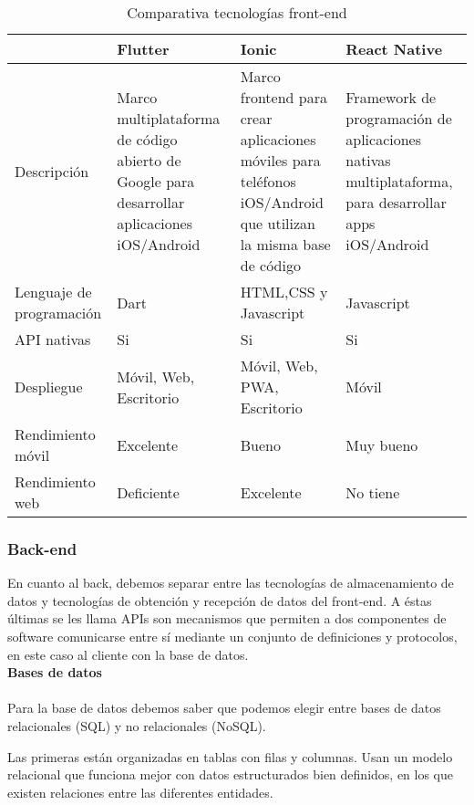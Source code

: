 \begin{table}[H] %
    \centering
    \begin{tabular}{|p{2cm} |p{4 cm} |p{4cm} |p{4cm} |} \hline 
         &  \textbf{Flutter}&  \textbf{Ionic}& \textbf{React Native}\\  \hline 
         Descripción &  Marco multiplataforma de código abierto de Google para desarrollar aplicaciones iOS/Android &  Marco frontend para crear aplicaciones móviles para teléfonos iOS/Android que utilizan la misma base de código& Framework de programación de aplicaciones nativas multiplataforma, para desarrollar apps iOS/Android\\ \hline 
         
        Lenguaje de programación &  Dart&  HTML,CSS y Javascript & Javascript\\ \hline 
        API nativas &  Si&  Si & Si\\ \hline 
        Despliegue &  Móvil, Web, Escritorio&  Móvil, Web, PWA, Escritorio & Móvil\\ \hline 
        Rendimiento móvil &  Excelente &  Bueno & Muy bueno\\ \hline 
        Rendimiento web &  Deficiente &  Excelente & No tiene\\ \hline 
    \end{tabular}
    \caption{Comparativa tecnologías front-end \cite{flut-ion} \cite{flut-react}}
    \label{tab:tec_front}
\end{table}

\subsubsection{Back-end}

En cuanto al back, debemos separar entre las tecnologías de almacenamiento de datos y tecnologías de obtención y recepción de datos del front-end. A éstas últimas se les llama APIs \cite{api} son mecanismos que permiten a dos componentes de software comunicarse entre sí mediante un conjunto de definiciones y protocolos, en este caso al cliente con la base de datos. \\

\textbf{Bases de datos} \\ \\
Para la base de datos debemos saber que podemos elegir entre bases de datos relacionales (SQL) y no relacionales (NoSQL).

Las primeras están organizadas en tablas con filas y columnas. Usan un modelo relacional que funciona mejor con datos estructurados bien definidos, en los que existen relaciones entre las diferentes entidades.

